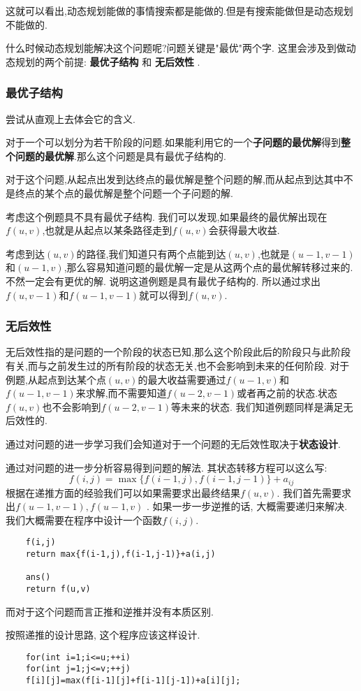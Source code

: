 这就可以看出,动态规划能做的事情搜索都是能做的.但是有搜索能做但是动态规划不能做的.

什么时候动态规划能解决这个问题呢?问题关键是"最优"两个字.
这里会涉及到做动态规划的两个前提: \textbf{最优子结构} 和 \textbf{无后效性} .


\subsubsection{最优子结构}尝试从直观上去体会它的含义.

对于一个可以划分为若干阶段的问题.如果能利用它的一个\textbf{子问题的最优解}得到\textbf{整个问题的最优解}.那么这个问题是具有最优子结构的.

对于这个问题,从起点出发到达终点的最优解是整个问题的解,而从起点到达其中不是终点的某个点的最优解是整个问题一个子问题的解.

考虑这个例题具不具有最优子结构.
我们可以发现,如果最终的最优解出现在$f(u,v)$,也就是从起点以某条路径走到$f(u,v)$会获得最大收益.

考虑到达$(u,v)$的路径,我们知道只有两个点能到达$(u,v)$,也就是$(u-1,v-1)$和$(u-1,v)$,那么容易知道问题的最优解一定是从这两个点的最优解转移过来的.不然一定会有更优的解.
说明这道例题是具有最优子结构的.
所以通过求出$f(u,v-1)$和$f(u-1,v-1)$就可以得到$f(u,v)$.




\subsubsection{无后效性}
无后效性指的是问题的一个阶段的状态已知,那么这个阶段此后的阶段只与此阶段有关,而与之前发生过的所有阶段的状态无关,也不会影响到未来的任何阶段.
对于例题,从起点到达某个点$(u,v)$的最大收益需要通过$f(u-1,v)$和$f(u-1,v-1)$来求解,而不需要知道$f(u-2,v-1)$或者再之前的状态.状态$f(u,v)$也不会影响到$f(u-2,v-1)$等未来的状态.
我们知道例题同样是满足无后效性的.

通过对问题的进一步学习我们会知道对于一个问题的无后效性取决于\textbf{状态设计}.


\begin{solve}
	通过对问题的进一步分析容易得到问题的解法.
	其状态转移方程可以这么写:
	\begin{equation*}
	f(i,j)=\max\{f(i-1,j),f(i-1,j-1)\}+a_{ij}
	\end{equation*}
	根据在递推方面的经验我们可以如果需要求出最终结果$f(u,v)$.
	我们首先需要求出$f(u-1,v-1), f(u-1,v)$ .
	如果一步一步逆推的话, 大概需要递归来解决.
	我们大概需要在程序中设计一个函数$f(i,j)$.
	\begin{verbatim}
	f(i,j)
	return max{f(i-1,j),f(i-1,j-1)}+a(i,j)
	
	ans()
	return f(u,v)
	\end{verbatim}
	而对于这个问题而言正推和逆推并没有本质区别.
	
	按照递推的设计思路, 这个程序应该这样设计.
	\begin{verbatim}
	for(int i=1;i<=u;++i)
	for(int j=1;j<=v;++j)
	f[i][j]=max(f[i-1][j]+f[i-1][j-1])+a[i][j];
	\end{verbatim}
\end{solve}
